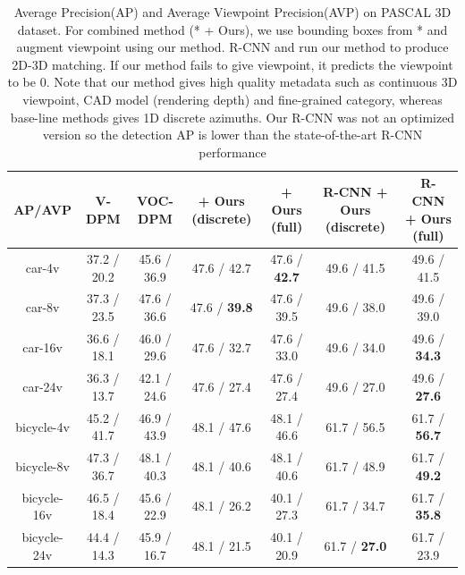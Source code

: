 \documentclass[10pt,twocolumn,letterpaper]{article}
\begin{document}
\begin{table}[!htbp]
    \footnotesize
  \begin{center}
\begin{tabular}{|c|c|c|c|c|c|c|}
\hline
AP/AVP              & V-DPM \cite{Xiang14} & VOC-DPM \cite{Pepik12}  & \cite{Pepik12} + Ours (discrete) & \cite{Pepik12} + Ours (full) & R-CNN + Ours (discrete) & R-CNN + Ours (full)\\
\hline\hline
car-4v              & 37.2 / 20.2         & 45.6 / 36.9             & 47.6 / 42.7       & 47.6 / \textbf{42.7}        & 49.6 / 41.5         & 49.6 / 41.5\\ \hline
car-8v              & 37.3 / 23.5         & 47.6 / 36.6             & 47.6 / \textbf{39.8}       & 47.6 / 39.5        & 49.6 / 38.0         & 49.6 / 39.0\\ \hline
car-16v             & 36.6 / 18.1         & 46.0 / 29.6             & 47.6 / 32.7       & 47.6 / 33.0        & 49.6 / 34.0         & 49.6 / \textbf{34.3}\\ \hline
car-24v             & 36.3 / 13.7         & 42.1 / 24.6             & 47.6 / 27.4       & 47.6 / 27.4        & 49.6 / 27.0         & 49.6 / \textbf{27.6}\\ \hline
\hline
bicycle-4v          & 45.2 / 41.7         & 46.9 / 43.9             & 48.1 / 47.6       & 48.1 / 46.6        & 61.7 / 56.5         & 61.7 / \textbf{56.7}\\ \hline
bicycle-8v          & 47.3 / 36.7         & 48.1 / 40.3             & 48.1 / 40.6       & 48.1 / 40.6        & 61.7 / 48.9         & 61.7 / \textbf{49.2}\\ \hline
bicycle-16v         & 46.5 / 18.4         & 45.6 / 22.9             & 48.1 / 26.2       & 40.1 / 27.3        & 61.7 / 34.7         & 61.7 / \textbf{35.8}\\ \hline
bicycle-24v         & 44.4 / 14.3         & 45.9 / 16.7             & 48.1 / 21.5       & 40.1 / 20.9        & 61.7 / \textbf{27.0}         & 61.7 / 23.9\\ \hline
\end{tabular}
\end{center}
\caption{Average Precision(AP) and Average Viewpoint Precision(AVP) on PASCAL 3D dataset\cite{Xiang14}. For combined method (* + Ours), we use bounding boxes from * and augment viewpoint using our method. R-CNN and run our method to produce 2D-3D matching. If our method fails to give viewpoint, it predicts the viewpoint to be 0. Note that our method gives high quality metadata such as continuous 3D viewpoint, CAD model (rendering depth) and fine-grained category, whereas base-line methods gives 1D discrete azimuths. Our R-CNN was not an optimized version so the detection AP is lower than the state-of-the-art R-CNN performance}
\label{tab:pascal12}
\end{table}
\end{document}
